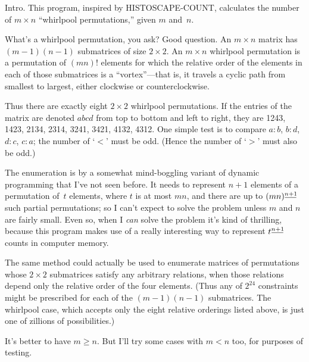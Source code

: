 
\datethis
\def\falling#1{^{\ff{#1}}}
\def\ff#1{\mkern1mu\underline{\mkern-1mu#1\mkern-2mu}\mkern2mu}


Intro. This program, inspired by {\mc HISTOSCAPE-COUNT}, calculates
the number of $m\times n$ ``whirlpool permutations,'' given $m$ and~$n$.

What's a whirlpool permutation, you ask? Good question.
An $m\times n$ matrix has $(m-1)(n-1)$ submatrices of size $2\times2$.
An $m\times n$ whirlpool permutation is a permutation of $(mn)!$
elements for which the relative order of the elements in each of those
submatrices is a ``vortex''---that is, it travels a cyclic path from
smallest to largest, either clockwise or counterclockwise.

Thus there are exactly eight $2\times2$ whirlpool permutations.
If the entries of the matrix are denoted $abcd$ from top to bottom
and left to right, they are 1243, 1423, 2134, 2314, 3241, 3421, 4132, 4312.
One simple test is to compare $a:b$, $b:d$, $d:c$, $c:a$; the number
of `$<$' must be odd. (Hence the number of `$>$' must also be odd.)

The enumeration is by a somewhat mind-boggling variant of dynamic programming
that I've not seen before. It needs to represent $n+1$ elements of
a permutation of~$t$ elements, where $t$ is at most $mn$,
and there are up to $(mn)\falling{n+1}$ such partial permutations;
so I can't expect to solve the problem unless $m$ and $n$ are
fairly small. Even so, when I {\it can\/} solve the problem it's kind of
thrilling, because this program makes use of a really interesting
way to represent $t\falling{n+1}$ counts in computer memory.

The same method could actually be used to enumerate matrices of permutations
whose $2\times2$ submatrices satisfy any arbitrary relations, when those
relations depend only the relative order of the four elements.
(Thus any of $2^{24}$ constraints might be prescribed for each of the
$(m-1)(n-1)$ submatrices. The whirlpool case, which accepts
only the eight relative orderings listed above, is just one of
zillions of possibilities.)

It's better to have $m\ge n$. But I'll try some cases with $m<n$ too,
for purposes of testing.

